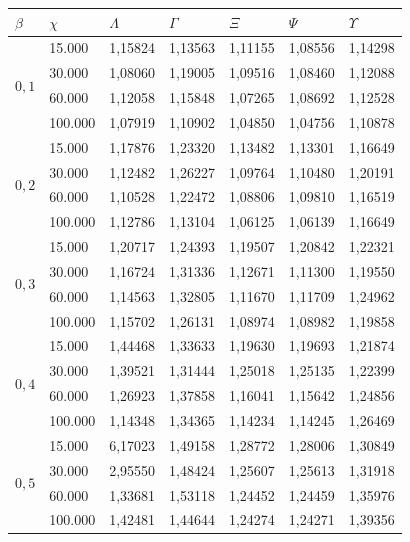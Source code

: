 \begin{table}[!ht]
\begin{center}
\begin{tabular}{|l|l|l|l|l|l|l|} %
\hline
$\beta$ & $\chi$ & $\Lambda$ & $\Gamma$ & $\Xi$ & $\Psi$ & $\Upsilon$ \\
\hline %
\multirow{4}{*}{$0,1$}
& 15.000 & 1,15824 & 1,13563 & 1,11155 & 1,08556 & 1,14298 \\
& 30.000 & 1,08060 & 1,19005 & 1,09516 & 1,08460 & 1,12088 \\
& 60.000 & 1,12058 & 1,15848 & 1,07265 & 1,08692 & 1,12528 \\
& 100.000 & 1,07919 & 1,10902 & 1,04850 & 1,04756 & 1,10878 \\
\hline %
\multirow{4}{*}{$0,2$}
& 15.000 & 1,17876 & 1,23320 & 1,13482 & 1,13301 & 1,16649 \\
& 30.000 & 1,12482 & 1,26227 & 1,09764 & 1,10480 & 1,20191 \\
& 60.000 & 1,10528 & 1,22472 & 1,08806 & 1,09810 & 1,16519\\
& 100.000 & 1,12786 & 1,13104 & 1,06125 & 1,06139 & 1,16649 \\
\hline %
\multirow{4}{*}{$0,3$}
& 15.000 & 1,20717 & 1,24393 & 1,19507 & 1,20842 & 1,22321 \\
& 30.000 & 1,16724 & 1,31336 & 1,12671 & 1,11300 & 1,19550 \\
& 60.000 & 1,14563 & 1,32805 & 1,11670 & 1,11709 & 1,24962 \\
& 100.000 & 1,15702 & 1,26131 & 1,08974 & 1,08982 & 1,19858 \\
\hline %
\multirow{4}{*}{$0,4$}
& 15.000 & 1,44468 & 1,33633 & 1,19630 & 1,19693 & 1,21874 \\
& 30.000 & 1,39521 & 1,31444 & 1,25018 & 1,25135 & 1,22399 \\
& 60.000 & 1,26923 & 1,37858 & 1,16041 & 1,15642 & 1,24856 \\
& 100.000 & 1,14348 & 1,34365 & 1,14234 & 1,14245 & 1,26469 \\
\hline %
\multirow{4}{*}{$0,5$}
& 15.000 & 6,17023 & 1,49158 & 1,28772 & 1,28006 & 1,30849 \\
& 30.000 & 2,95550 & 1,48424 & 1,25607 & 1,25613 & 1,31918 \\
& 60.000 & 1,33681 & 1,53118 & 1,24452 & 1,24459 & 1,35976 \\
& 100.000 & 1,42481 & 1,44644 & 1,24274 & 1,24271 & 1,39356 \\

\end{tabular}
\end{center}
\end{table}
